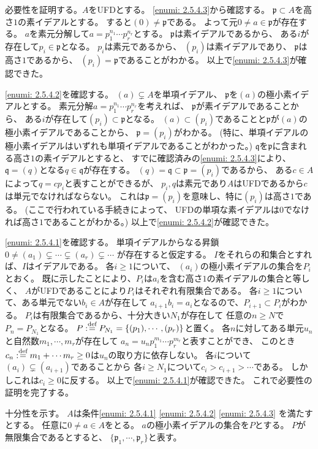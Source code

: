 \documentclass[uplatex]{jsarticle}
\makeatletter
\theoremstyle{definition}
\renewenvironment{proof}[1][\proofname]{
  \pushQED{\qed}%
  \normalfont \topsep6\p@\@plus6\p@\relax
  \trivlist
  \item[\hskip\labelsep
    #1\@addpunct{\textbf{.}}]\ignorespaces
}{%
  \popQED\endtrivlist\@endpefalse
}
\providecommand{\proofname}{証明}
\newcommand\mfp{\mathfrak{p}}
\newcommand\mfq{\mathfrak{q}}
\def\dfn{:\overset{\mbox{{\scriptsize def}}}{=}}
\makeatother
\begin{document}
\begin{proof}
  必要性を証明する。\(A\)をUFDとする。
  \ref{enumi: 2.5.4.3}から確認する。
  \(\mfp\subset A\)を高さ\(1\)の素イデアルとする。
  すると\((0)\neq \mfp\)である。
  よって元\(0\neq a\in \mfp\)が存在する。
  \(a\)を素元分解して\(a=p_1^{n_1}\cdots p_r^{n_r}\)とする。
  \(\mfp\)は素イデアルであるから、
  ある\(i\)が存在して\(p_i\in \mfp\)となる。
  \(p_i\)は素元であるから、
  \((p_i)\)は素イデアルであり、
  \(\mfp\)は高さ\(1\)であるから、
  \((p_i) = \mfp\)であることがわかる。
  以上で\ref{enumi: 2.5.4.3}が確認できた。

  \ref{enumi: 2.5.4.2}を確認する。
  \((a)\subsetneq A\)を単項イデアル、
  \(\mfp\)を\((a)\)の極小素イデアルとする。
  素元分解\(a=p_1^{n_1}\cdots p_r^{n_r}\)を考えれば、
  \(\mfp\)が素イデアルであることから、
  ある\(i\)が存在して\((p_i)\subset \mfp\)となる。
  \((a)\subset (p_i)\)であることと\(\mfp\)が\((a)\)の極小素イデアルであることから、
  \(\mfp = (p_i)\)がわかる。
  (特に、単項イデアルの極小素イデアルはいずれも単項イデアルであることがわかった。)
  \(\mfq\)を\(\mfp\)に含まれる高さ\(1\)の素イデアルとすると、
  すでに確認済みの\ref{enumi: 2.5.4.3}により、
  \(\mfq = (q)\)となる\(q\in \mfq\)が存在する。
  \((q) = \mfq \subset \mfp = (p_i)\)であるから、
  ある\(c\in A\)によって\(q=cp_i\)と表すことができるが、
  \(p_i,q\)は素元であり\(A\)はUFDであるから\(c\)は単元でなければならない。
  これは\(\mfp = (p_i)\)を意味し、特に\((p_i)\)は高さ\(1\)である。
  (ここで行われている手続きによって、
  UFDの単項な素イデアルは\(0\)でなければ高さ\(1\)であることがわかる。)
  以上で\ref{enumi: 2.5.4.2}が確認できた。

  \ref{enumi: 2.5.4.1}を確認する。
  単項イデアルからなる昇鎖
  \(0\neq (a_1)\subsetneq \cdots \subsetneq (a_r) \subsetneq \cdots \)
  が存在すると仮定する。
  \(I\)をそれらの和集合とすれば、\(I\)はイデアルである。
  各\(i\geq 1\)について、
  \((a_i)\)の極小素イデアルの集合を\(P_i\)とおく。
  既に示したことにより、\(P_i\)は\(a_i\)を含む高さ\(1\)の素イデアルの集合と等しく、
  \(A\)がUFDであることにより\(P_i\)はそれぞれ有限集合である。
  各\(i\geq 1\)について、ある単元でない\(b_i\in A\)が存在して
  \(a_{i+1} b_i = a_i\)となるので、\(P_{i+1}\subset P_i\)がわかる。
  \(P_i\)は有限集合であるから、十分大きい\(N_1\)が存在して
  任意の\(n\geq N\)で\(P_n = P_{N_1}\)となる。
  \(P \dfn P_{N_1} = \{(p_1),\cdots, (p_r)\}\)と置く。
  各\(n\)に対してある単元\(u_n\)と自然数\(m_1,\cdots, m_r\)が存在して
  \(a_n = u_np_1^{m_1}\cdots p_r^{m_r}\)と表すことができ、
  このとき\(c_n \dfn m_1+\cdots m_r \geq 0\)は\(u_n\)の取り方に依存しない。
  各\(i\)について\((a_i)\subsetneq (a_{i+1})\)であることから
  各\(i\geq N_1\)について\(c_i > c_{i+1} > \cdots\)である。
  しかしこれは\(c_i\geq 0\)に反する。
  以上で\ref{enumi: 2.5.4.1}が確認できた。
  これで必要性の証明を完了する。

  十分性を示す。
  \(A\)は条件\ref{enumi: 2.5.4.1} \ref{enumi: 2.5.4.2} \ref{enumi: 2.5.4.3}
  を満たすとする。
  任意に\(0\neq a\in A\)をとる。
  \(a\)の極小素イデアルの集合を\(P\)とする。
  \(P\)が無限集合であるとすると、
  \(\{\mfp_1,\cdots, \mfp_r\}\)と表す。
\end{proof}
\end{document}
